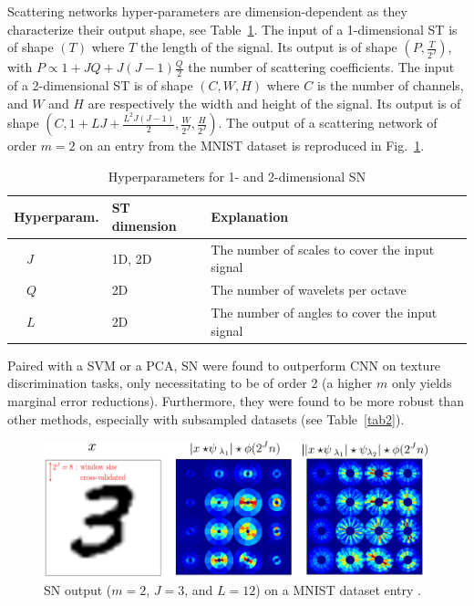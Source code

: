 \documentclass[runningheads]{llncs}
\begin{document}
Scattering networks hyper-parameters are dimension-dependent\cite{andreux}\cite{mallatgroup}\cite{mallatIEEE}\cite{mallatlecture} as they characterize their output shape, see Table~\ref{tab1}. The input of a 1-dimensional ST is of shape $(T)$ where $T$ the length of the signal. Its output is of shape $(P, \frac{T}{2^J})$, with $P \propto 1+JQ + J(J-1)\frac{Q}{2}$ the number of scattering coefficients\cite{anden}. The input of a 2-dimensional ST is of shape $(C, W, H)$ where $C$ is the number of channels, and $W$ and $H$ are respectively the width and height of the signal. Its output is of shape $(C, 1+LJ + \frac{L^2J(J-1)}{2},\frac{W}{2^J},\frac{H}{2^J})$\cite{bruna2012invariant}. The output of a scattering network of order $m=2$ on an entry from the MNIST dataset\cite{lecun2} is reproduced in Fig.~\ref{fig2}.
\begin{table}\centering
\caption{Hyperparameters for 1- and 2-dimensional SN}\label{tab1}
\begin{tabular}{| p{2cm} | p{2.5cm} | p{7cm} |}
\hline
Hyperparam. & ST dimension & Explanation \\
\hline
$\quad J$ & 1D, 2D & The number of scales to cover the input signal \\
$\quad Q$ & 2D & The number of wavelets per octave \\
$\quad L$ & 2D & The number of angles to cover the input signal \\
\hline
\end{tabular}
\end{table}

Paired with a SVM or a PCA, SN were found to outperform CNN on texture discrimination tasks, only necessitating to be of order 2\cite{mallatIEEE}\cite{mallatlecture} (a higher $m$ only yields marginal error reductions). Furthermore, they were found to be more robust than other methods, especially with subsampled datasets (see Table~\ref{tab2}).
\begin{figure}
\centering\includegraphics[width=\textwidth]{MNIST.png}
\caption{SN output ($m=2$, $J=3$, and $L=12$) on a MNIST dataset entry \cite{maison}\cite{mallatlecture}.} \label{fig2}
\end{figure}
\end{document}
